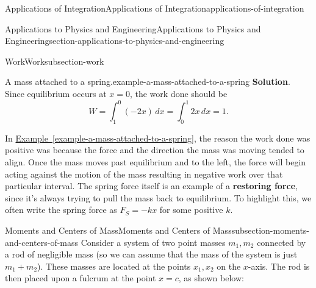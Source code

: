 \documentclass[oneside,10pt,]{book}
\newcommand{\terminology}[1]{\textbf{#1}}
\numberwithin{equation}{section}
\begin{document}
\begin{chapterptx}{Applications of Integration}{}{Applications of Integration}{}{}{applications-of-integration}
\begin{sectionptx}{Applications to Physics and Engineering}{}{Applications to Physics and Engineering}{}{}{section-applications-to-physics-and-engineering}
\begin{subsectionptx}{Work}{}{Work}{}{}{subsection-work}
\begin{example}{A mass attached to a spring.}{example-a-mass-attached-to-a-spring}
\noindent\textbf{Solution}.\hypertarget{solution-149}{}\quad%
\hypertarget{p-686}{}%
Since equilibrium occurs at \(x = 0\), the work done should be%
\begin{equation*}
W = \int_{1}^{0}(-2x)\,dx = \int_{0}^{1}2x\,dx = 1.
\end{equation*}
%
\end{example}
\hypertarget{p-687}{}%
In \hyperref[example-a-mass-attached-to-a-spring]{Example~\ref{example-a-mass-attached-to-a-spring}}, the reason the work done was positive was because the force and the direction the mass was moving tended to align. Once the mass moves past equilibrium and to the left, the force will begin acting against the motion of the mass resulting in negative work over that particular interval. The spring force itself is an example of a \terminology{restoring force}, since it's always trying to pull the mass back to equilibrium. To highlight this, we often write the spring force as \(F_{S} = -kx\) for some positive \(k\).%
\end{subsectionptx}
%
%
\typeout{************************************************}
\typeout{************************************************}
%
\begin{subsectionptx}{Moments and Centers of Mass}{}{Moments and Centers of Mass}{}{}{subsection-moments-and-centers-of-mass}
\hypertarget{p-688}{}%
Consider a system of two point masses \(m_{1},m_{2}\) connected by a rod of negligible mass (so we can assume that the mass of the system is just \(m_{1}+m_{2}\)). These masses are located at the points \(x_{1},x_{2}\) on the \(x\)-axis. The rod is then placed upon a fulcrum at the point \(x=c\), as shown below:%
\begin{figure}
\centering
{
}
\end{figure}
\end{subsectionptx}
\end{sectionptx}
\end{chapterptx}
\end{document}
